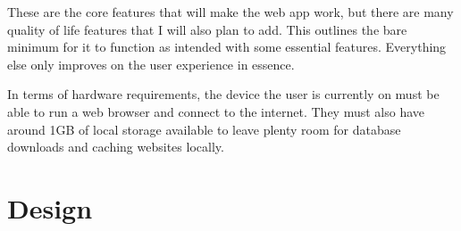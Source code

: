 \documentclass{article}
\begin{document}
These are the core features that will make the web app work, but there are many quality of life features that I will also plan to add. This outlines the bare minimum for it to function as intended with some essential features. Everything else only improves on the user experience in essence. 

In terms of hardware requirements, the device the user is currently on must be able to run a web browser and connect to the internet. They must also have around 1GB of local storage available to leave plenty room for database downloads and caching websites locally.

\section{Design}
\end{document}
